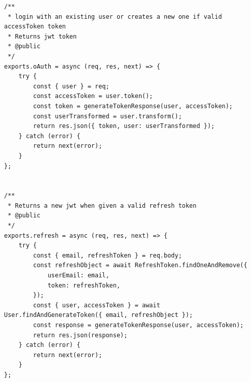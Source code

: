\documentclass[12pt]{article}
\begin{document}
\begin{verbatim}
/**
 * login with an existing user or creates a new one if valid accessToken token
 * Returns jwt token
 * @public
 */
exports.oAuth = async (req, res, next) => {
    try {
        const { user } = req;
        const accessToken = user.token();
        const token = generateTokenResponse(user, accessToken);
        const userTransformed = user.transform();
        return res.json({ token, user: userTransformed });
    } catch (error) {
        return next(error);
    }
};


/**
 * Returns a new jwt when given a valid refresh token
 * @public
 */
exports.refresh = async (req, res, next) => {
    try {
        const { email, refreshToken } = req.body;
        const refreshObject = await RefreshToken.findOneAndRemove({
            userEmail: email,
            token: refreshToken,
        });
        const { user, accessToken } = await User.findAndGenerateToken({ email, refreshObject });
        const response = generateTokenResponse(user, accessToken);
        return res.json(response);
    } catch (error) {
        return next(error);
    }
};

 \end{verbatim}
 
\end{document}
